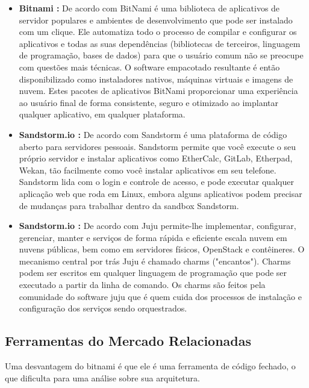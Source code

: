 \begin{itemize}
  \item  \textbf{Bitnami :}
  De acordo com \cite{bitnami} BitNami é uma biblioteca de aplicativos de
  servidor populares e ambientes de desenvolvimento que pode ser instalado
  com um clique. Ele automatiza todo o processo de  compilar e configurar os
   aplicativos e todas as suas dependências (bibliotecas de terceiros,
  linguagem de programação, bases de dados) para que o usuário comum não
  se preocupe com questões mais técnicas. O software empacotado resultante é
  então disponibilizado como instaladores nativos, máquinas virtuais e imagens de nuvem.
  Estes pacotes de aplicativos BitNami proporcionar uma experiência ao usuário final
  de forma consistente, seguro e otimizado ao implantar qualquer aplicativo, em qualquer plataforma.

  \item  \textbf{Sandstorm.io :}
  De acordo com \cite{standstormio} Sandstorm é uma plataforma de código
  aberto para servidores pessoais. Sandstorm permite que você execute o seu próprio
  servidor e instalar aplicativos como EtherCalc, GitLab, Etherpad, Wekan, tão
  facilmente como você instalar aplicativos em seu telefone.
  Sandstorm lida com o login e controle de acesso, e pode executar qualquer aplicação
   web que roda em Linux,  embora alguns aplicativos podem precisar de mudanças para trabalhar
  dentro da sandbox Sandstorm.

 \item  \textbf{Sandstorm.io :}
 De acordo com \cite{juju} Juju permite-lhe implementar,
 configurar, gerenciar, manter e serviços de forma rápida e eficiente escala nuvem
 em nuvens públicas, bem como em servidores físicos, OpenStack e contêineres.
 O mecanismo central por trás Juju é chamado charms ("encantos"). Charms podem
 ser escritos em qualquer linguagem de programação que pode ser executado
 a partir da linha de comando. Os charms são feitos pela comunidade do software juju
 que é quem cuida dos processos de instalação e configuração dos serviços sendo orquestrados.

\end{itemize}

\subsection{Ferramentas do Mercado Relacionadas}

Uma desvantagem do bitnami é que ele é uma ferramenta de código fechado, o que
dificulta para uma análise sobre sua arquitetura.

